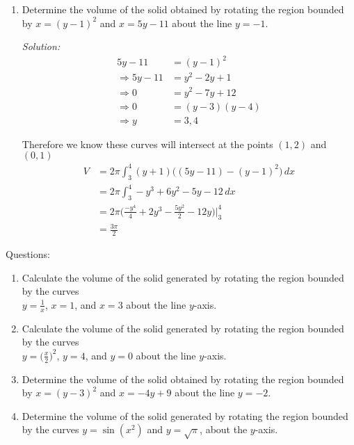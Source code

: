 \documentclass[16pt]{article}
\theoremstyle{remark}
\begin{document}
\begin{enumerate}
\item Determine the volume of the solid obtained by rotating the region bounded by 
$x=(y-1)^2$ and $x=5y-11$ about the line $y=-1$.
\begin{mdframed}[style=TheoremFrame]
\textit{Solution:}
\begin{align*}
5y-11 &= (y-1)^2\\
\Rightarrow 5y-11 &= y^2 - 2y + 1\\
\Rightarrow 0 &=  y^2 - 7y + 12\\
\Rightarrow 0 &= (y-3)(y-4)\\
\Rightarrow y&= 3,4
\end{align*}

Therefore we know these curves will intersect at the points $(1,2)$ and $(0,1)$
\begin{align*}
V &= 2\pi \int_3^4 (y+1) \big((5y-11)-(y-1)^2\big) \, dx\\
&=  2\pi \int_3^4 -y^3 + 6y^2 - 5y -12 \, dx\\
&= 2\pi \bigg( \frac{-y^4}{4} + 2y^3 - \frac{5y^2}{2} - 12y \bigg) \bigg|_3^4\\
&= \frac{3\pi}{2}
\end{align*}
\end{mdframed}
\end{enumerate}
\newpage
Questions:
\begin{enumerate}
\item Calculate the volume of the solid generated by rotating the region bounded by the curves\\ $\displaystyle{y=\frac{1}{x}}$, $x=1$, and $x=3$ about the line $y$-axis.
\vspace{8.5cm}
\item Calculate the volume of the solid generated by rotating the region bounded by the curves\\ $\displaystyle{y=\bigg(\frac{x}{2}\bigg)^2}$, $y=4$, and $y=0$ about the line $y$-axis.

\newpage
\item Determine the volume of the solid obtained by rotating the region bounded by 
$x=(y-3)^2$ and $x=-4y+9$ about the line $y=-2$.
\vspace{8.5cm}
\item Determine the volume of the solid generated by rotating the region bounded by the curves $y=\sin(x^2)$ and $y=\sqrt{\pi}$, about the $y$-axis.
\end{enumerate}
\end{document}

